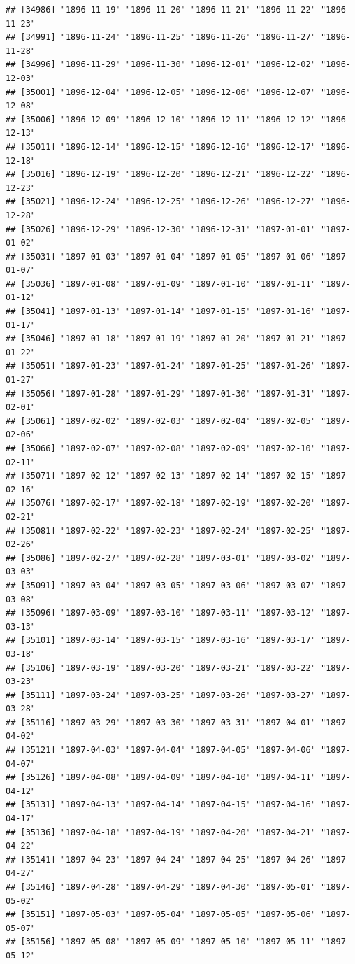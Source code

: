 \documentclass{article}\usepackage[]{graphicx}\usepackage[]{color}
\makeatletter
\newenvironment{kframe}{%
 \def\at@end@of@kframe{}%
 \ifinner\ifhmode%
  \def\at@end@of@kframe{\end{minipage}}%
  \begin{minipage}{\columnwidth}%
 \fi\fi%
 \def\FrameCommand##1{\hskip\@totalleftmargin \hskip-\fboxsep
 \colorbox{shadecolor}{##1}\hskip-\fboxsep
     \hskip-\linewidth \hskip-\@totalleftmargin \hskip\columnwidth}%
 \MakeFramed {\advance\hsize-\width
   \@totalleftmargin\z@ \linewidth\hsize
   \@setminipage}}%
 {\par\unskip\endMakeFramed%
 \at@end@of@kframe}
\newenvironment{knitrout}{}{} %
\makeatother
\begin{document}
\begin{description}
\begin{knitrout}
\begin{kframe}
\begin{verbatim}
## [34986] "1896-11-19" "1896-11-20" "1896-11-21" "1896-11-22" "1896-11-23"
## [34991] "1896-11-24" "1896-11-25" "1896-11-26" "1896-11-27" "1896-11-28"
## [34996] "1896-11-29" "1896-11-30" "1896-12-01" "1896-12-02" "1896-12-03"
## [35001] "1896-12-04" "1896-12-05" "1896-12-06" "1896-12-07" "1896-12-08"
## [35006] "1896-12-09" "1896-12-10" "1896-12-11" "1896-12-12" "1896-12-13"
## [35011] "1896-12-14" "1896-12-15" "1896-12-16" "1896-12-17" "1896-12-18"
## [35016] "1896-12-19" "1896-12-20" "1896-12-21" "1896-12-22" "1896-12-23"
## [35021] "1896-12-24" "1896-12-25" "1896-12-26" "1896-12-27" "1896-12-28"
## [35026] "1896-12-29" "1896-12-30" "1896-12-31" "1897-01-01" "1897-01-02"
## [35031] "1897-01-03" "1897-01-04" "1897-01-05" "1897-01-06" "1897-01-07"
## [35036] "1897-01-08" "1897-01-09" "1897-01-10" "1897-01-11" "1897-01-12"
## [35041] "1897-01-13" "1897-01-14" "1897-01-15" "1897-01-16" "1897-01-17"
## [35046] "1897-01-18" "1897-01-19" "1897-01-20" "1897-01-21" "1897-01-22"
## [35051] "1897-01-23" "1897-01-24" "1897-01-25" "1897-01-26" "1897-01-27"
## [35056] "1897-01-28" "1897-01-29" "1897-01-30" "1897-01-31" "1897-02-01"
## [35061] "1897-02-02" "1897-02-03" "1897-02-04" "1897-02-05" "1897-02-06"
## [35066] "1897-02-07" "1897-02-08" "1897-02-09" "1897-02-10" "1897-02-11"
## [35071] "1897-02-12" "1897-02-13" "1897-02-14" "1897-02-15" "1897-02-16"
## [35076] "1897-02-17" "1897-02-18" "1897-02-19" "1897-02-20" "1897-02-21"
## [35081] "1897-02-22" "1897-02-23" "1897-02-24" "1897-02-25" "1897-02-26"
## [35086] "1897-02-27" "1897-02-28" "1897-03-01" "1897-03-02" "1897-03-03"
## [35091] "1897-03-04" "1897-03-05" "1897-03-06" "1897-03-07" "1897-03-08"
## [35096] "1897-03-09" "1897-03-10" "1897-03-11" "1897-03-12" "1897-03-13"
## [35101] "1897-03-14" "1897-03-15" "1897-03-16" "1897-03-17" "1897-03-18"
## [35106] "1897-03-19" "1897-03-20" "1897-03-21" "1897-03-22" "1897-03-23"
## [35111] "1897-03-24" "1897-03-25" "1897-03-26" "1897-03-27" "1897-03-28"
## [35116] "1897-03-29" "1897-03-30" "1897-03-31" "1897-04-01" "1897-04-02"
## [35121] "1897-04-03" "1897-04-04" "1897-04-05" "1897-04-06" "1897-04-07"
## [35126] "1897-04-08" "1897-04-09" "1897-04-10" "1897-04-11" "1897-04-12"
## [35131] "1897-04-13" "1897-04-14" "1897-04-15" "1897-04-16" "1897-04-17"
## [35136] "1897-04-18" "1897-04-19" "1897-04-20" "1897-04-21" "1897-04-22"
## [35141] "1897-04-23" "1897-04-24" "1897-04-25" "1897-04-26" "1897-04-27"
## [35146] "1897-04-28" "1897-04-29" "1897-04-30" "1897-05-01" "1897-05-02"
## [35151] "1897-05-03" "1897-05-04" "1897-05-05" "1897-05-06" "1897-05-07"
## [35156] "1897-05-08" "1897-05-09" "1897-05-10" "1897-05-11" "1897-05-12"

\end{verbatim}
\end{kframe}
\end{knitrout}
\end{description}
\end{document}
